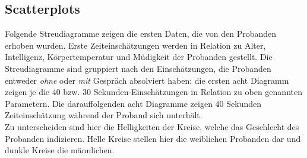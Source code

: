 \documentclass{Paper}
\begin{document}
\subsection{Scatterplots}
Folgende Streudiagramme zeigen die ersten Daten, die von den Probanden erhoben wurden. Erste Zeiteinschätzungen werden in Relation zu Alter, Intelligenz, Körpertemperatur und Müdigkeit der Probanden gestellt.
Die Streudiagramme sind gruppiert nach den Einschätzungen, die Probanden entweder \textit{ohne} oder \textit{mit} Gespräch absolviert haben: die ersten acht Diagramm zeigen je die 40 bzw. 30 Sekunden-Einschätzungen in Relation zu oben genannten Parametern. Die darauffolgenden acht Diagramme zeigen 40 Sekunden Zeiteinschätzung während der Proband sich unterhält.\\
Zu unterscheiden sind hier die Helligkeiten der Kreise, welche das Geschlecht des Probanden indizieren. Helle Kreise stellen hier die weiblichen Probanden dar und dunkle Kreise die männlichen.
\end{document}
